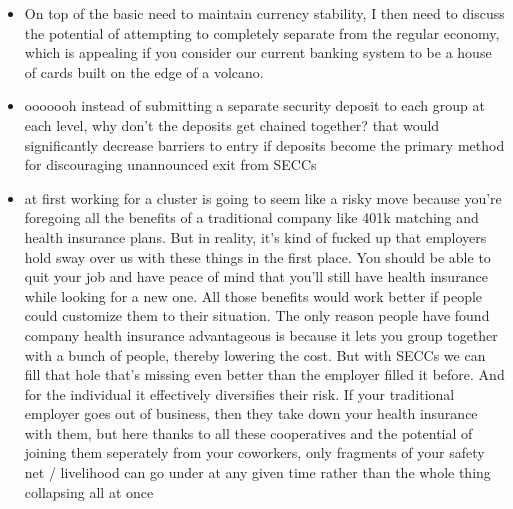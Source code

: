 \documentclass{article}[10pt]
\begin{document}
\begin{itemize}
    \item On top of the basic need to maintain currency stability, I then need to discuss the potential of attempting to completely separate from the regular economy, which is appealing if you consider our current banking system to be a house of cards built on the edge of a volcano.

    \item ooooooh instead of submitting a separate security deposit to each group at each level, why don't the deposits get chained together? 
    that would significantly decrease barriers to entry if deposits become the primary method for discouraging unannounced exit from SECCs

    \item at first working for a cluster is going to seem like a risky move because you're foregoing all the benefits of a traditional company like 401k matching and health insurance plans. 
    But in reality, it's kind of fucked up that employers hold sway over us with these things in the first place. 
    You should be able to quit your job and have peace of mind that you'll still have health insurance while looking for a new one.
    All those benefits would work better if people could customize them to their situation. 
    The only reason people have found company health insurance advantageous is because it lets you group together with a bunch of people, thereby lowering the cost. 
    But with SECCs we can fill that hole that's missing even better than the employer filled it before. 
    And for the individual it effectively diversifies their risk. 
    If your traditional employer goes out of business, then they take down your health insurance with them, but here thanks to all these cooperatives and the potential of joining them seperately from your coworkers, only fragments of your safety net / livelihood can go under at any given time rather than the whole thing collapsing all at once


\end{itemize}
\end{document}
